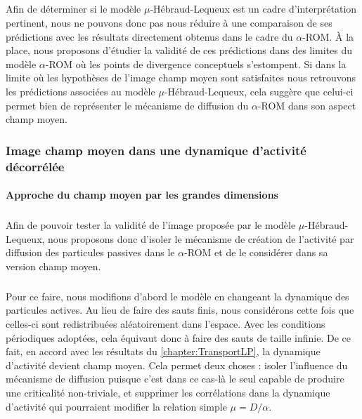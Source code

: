 \subparagraph{}Afin de déterminer si le modèle $\mu$-Hébraud-Lequeux est un cadre d'interprétation pertinent, nous ne pouvons donc pas nous réduire à une comparaison de ses prédictions avec les résultats directement obtenus dans le cadre du $\alpha$-ROM. \`A la place, nous proposons d'étudier la validité de ces prédictions dans des limites du modèle $\alpha$-ROM où les points de divergence conceptuels s'estompent. Si dans la limite où les hypothèses de l'image champ moyen sont satisfaites nous retrouvons les prédictions associées au modèle $\mu$-Hébraud-Lequeux, cela suggère que celui-ci permet bien de représenter le mécanisme de diffusion du $\alpha$-ROM dans son aspect champ moyen.

\subsubsection{Image champ moyen dans une dynamique d'activité décorrélée}

\paragraph{Approche du champ moyen par les grandes dimensions}

\subparagraph{}Afin de pouvoir tester la validité de l'image proposée par le modèle $\mu$-Hébraud-Lequeux, nous proposons donc d'isoler le mécanisme de création de l'activité par diffusion des particules passives dans le $\alpha$-ROM et de le considérer dans sa version champ moyen. 

\subparagraph{}Pour ce faire, nous modifions d'abord le modèle en changeant la dynamique des particules actives. Au lieu de faire des sauts finis, nous considérons cette fois que celles-ci sont redistribuées aléatoirement dans l'espace. Avec les conditions périodiques adoptées, cela équivaut donc à faire des sauts de taille infinie. De ce fait, en accord avec les résultats du \autoref{chapter:TransportLP}, la dynamique d'activité devient champ moyen. Cela permet deux choses : isoler l'influence du mécanisme de diffusion puisque c'est dans ce cas-là le seul capable de produire une criticalité non-triviale, et supprimer les corrélations dans la dynamique d'activité qui pourraient modifier la relation simple $\mu = D/\alpha$.

